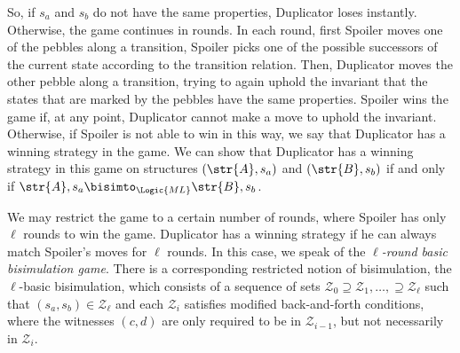 So, if $s_{a}$ and $s_{b}$ do not have the same properties, Duplicator loses instantly.
Otherwise, the game continues in rounds.
In each round, first Spoiler moves one of the pebbles along a transition, \ie{} Spoiler picks one of the possible successors of the current state according to the transition relation.
Then, Duplicator moves the other pebble along a transition, trying to again uphold the invariant that the states that are marked by the pebbles have the same properties.
Spoiler wins the game if, at any point, Duplicator cannot make a move to uphold the invariant.
Otherwise, if Spoiler is not able to win in this way, we say that Duplicator has a winning strategy in the game.
We can show that Duplicator has a winning strategy in this game on structures $(\str{A}, s_{a})$ and $(\str{B}, s_{b})$ if and only if $\str{A}, s_{a} \bisimto_{\Logic{ML}} \str{B}, s_{b}$.

We may restrict the game to a certain number of rounds, where Spoiler has only $\ell$ rounds to win the game.
Duplicator has a winning strategy if he can always match Spoiler's moves for $\ell$ rounds.
In this case, we speak of the \emph{$\ell$-round basic bisimulation game}.
There is a corresponding restricted notion of bisimulation, the $\ell$-basic bisimulation, which consists of a sequence of sets $\mathcal{Z}_{0} \supseteq \mathcal{Z}_{1}, \ldots, \supseteq \mathcal{Z}_{\ell}$ such that $(s_{a}, s_{b}) \in \mathcal{Z}_{\ell}$ and each $\mathcal{Z}_{i}$ satisfies modified back-and-forth conditions, where the witnesses $(c,d)$ are only required to be in $\mathcal{Z}_{i-1}$, but not necessarily in $\mathcal{Z}_{i}$.

